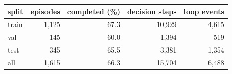\begin{tabular}{lrrrr}\toprule
split & episodes & completed (\%) & decision steps & loop events \\\midrule
train & 1,125 & 67.3 & 10,929 & 4,615 \\
val & 145 & 60.0 & 1,394 & 519 \\
test & 345 & 65.5 & 3,381 & 1,354 \\
all & 1,615 & 66.3 & 15,704 & 6,488 \\
\bottomrule\end{tabular}
